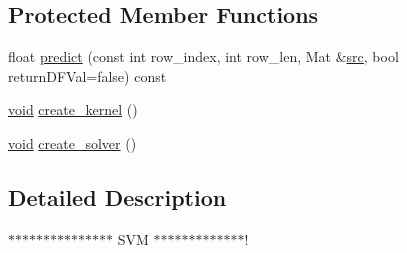 \subsection*{Protected Member Functions}
\begin{DoxyCompactItemize}
\item 
float \hyperlink{classcv_1_1ocl_1_1CvSVM__OCL_a06d0567cc55fe43b510f1d4916a4ffea}{predict} (const int row\-\_\-index, int row\-\_\-len, Mat \&\hyperlink{legacy_8hpp_a371cd109b74033bc4366f584edd3dacc}{src}, bool return\-D\-F\-Val=false) const 
\item 
\hyperlink{legacy_8hpp_a8bb47f092d473522721002c86c13b94e}{void} \hyperlink{classcv_1_1ocl_1_1CvSVM__OCL_a6ca9e0530824dafd41be2b880890ca83}{create\-\_\-kernel} ()
\item 
\hyperlink{legacy_8hpp_a8bb47f092d473522721002c86c13b94e}{void} \hyperlink{classcv_1_1ocl_1_1CvSVM__OCL_af9413d69eb36ce2321644b7d008828e2}{create\-\_\-solver} ()
\end{DoxyCompactItemize}


\subsection{Detailed Description}
$\ast$$\ast$$\ast$$\ast$$\ast$$\ast$$\ast$$\ast$$\ast$$\ast$$\ast$$\ast$$\ast$$\ast$$\ast$ S\-V\-M $\ast$$\ast$$\ast$$\ast$$\ast$$\ast$$\ast$$\ast$$\ast$$\ast$$\ast$$\ast$$\ast$! 

